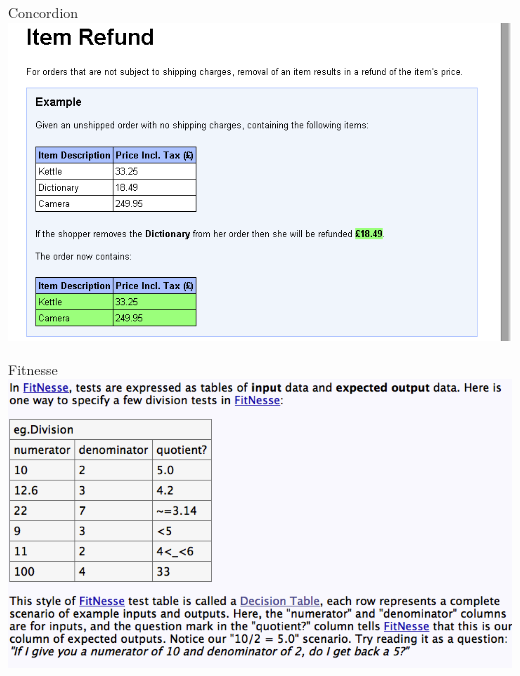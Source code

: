 \begin{frame}{Concordion}
\includegraphics[width=\textwidth]{Concordion.png} \newline
\end{frame}


\begin{frame}{Fitnesse}
\includegraphics[width=\textwidth]{Fitnesse.png} \newline
\end{frame}

